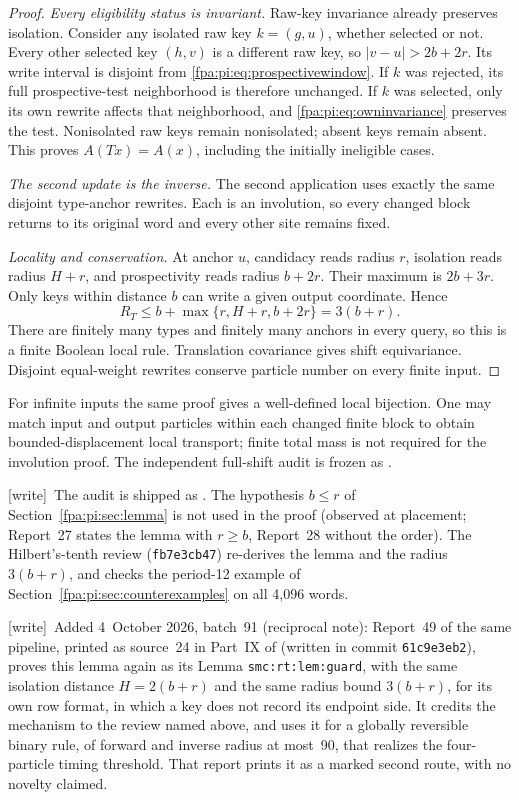 \documentclass[11pt,a4paper]{article}
\numberwithin{equation}{section}
\newcommand{\file}[1]{\texttt{\detokenize{#1}}}
\newcommand{\wtag}{\textup{[write]}}
\begin{document}
\begin{proof}
\emph{Every eligibility status is invariant.} Raw-key invariance already preserves isolation. Consider any isolated raw key $k=(g,u)$, whether selected or not. Every other selected key $(h,v)$ is a different raw key, so $|v-u|>2b+2r$. Its write interval is disjoint from \eqref{fpa:pi:eq:prospectivewindow}. If $k$ was rejected, its full prospective-test neighborhood is therefore unchanged. If $k$ was selected, only its own rewrite affects that neighborhood, and \eqref{fpa:pi:eq:owninvariance} preserves the test. Nonisolated raw keys remain nonisolated; absent keys remain absent. This proves $A(Tx)=A(x)$, including the initially ineligible cases.

\emph{The second update is the inverse.} The second application uses exactly the same disjoint type-anchor rewrites. Each is an involution, so every changed block returns to its original word and every other site remains fixed.

\emph{Locality and conservation.} At anchor $u$, candidacy reads radius $r$, isolation reads radius $H+r$, and prospectivity reads radius $b+2r$. Their maximum is $2b+3r$. Only keys within distance $b$ can write a given output coordinate. Hence
\[
 R_T\le b+\max\{r,H+r,b+2r\}=3(b+r).
\]
There are finitely many types and finitely many anchors in every query, so this is a finite Boolean local rule. Translation covariance gives shift equivariance. Disjoint equal-weight rewrites conserve particle number on every finite input.
\end{proof}

For infinite inputs the same proof gives a well-defined local bijection. One may match input and output particles within each changed finite block to obtain bounded-displacement local transport; finite total mass is not required for the involution proof. The independent full-shift audit is frozen as \file{scientific/audit-lemma.md}.

\wtag\ The audit is shipped as . The hypothesis $b\le r$ of Section~\ref{fpa:pi:sec:lemma} is not used in the proof (observed at placement; Report~27 states the lemma with $r\ge b$, Report~28 without the order). The Hilbert's-tenth review  (\texttt{fb7e3cb47}) re-derives the lemma and the radius $3(b+r)$, and checks the period-12 example of Section~\ref{fpa:pi:sec:counterexamples} on all 4,096 words.

\wtag\ Added 4~October 2026, batch~91 (reciprocal note): Report~49 of the same pipeline, printed as source~24 in Part~IX of  (written in commit \texttt{61c9e3eb2}), proves this lemma again as its Lemma \texttt{smc:rt:lem:guard}, with the same isolation distance $H=2(b+r)$ and the same radius bound $3(b+r)$, for its own row format, in which a key does not record its endpoint side. It credits the mechanism to the review named above, and uses it for a globally reversible binary rule, of forward and inverse radius at most~90, that realizes the four-particle timing threshold. That report prints it as a marked second route, with no novelty claimed.
\end{document}
